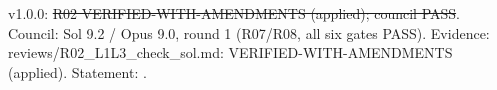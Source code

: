 \begin{statusbox}
 v1.0.0: \st{R02 VERIFIED-WITH-AMENDMENTS (applied); council PASS}. Council: Sol 9.2 / Opus 9.0, round 1 (R07/R08, all six gates PASS). Evidence: reviews/R02\_L1L3\_check\_sol.md: VERIFIED-WITH-AMENDMENTS (applied). Statement: .
\end{statusbox}
